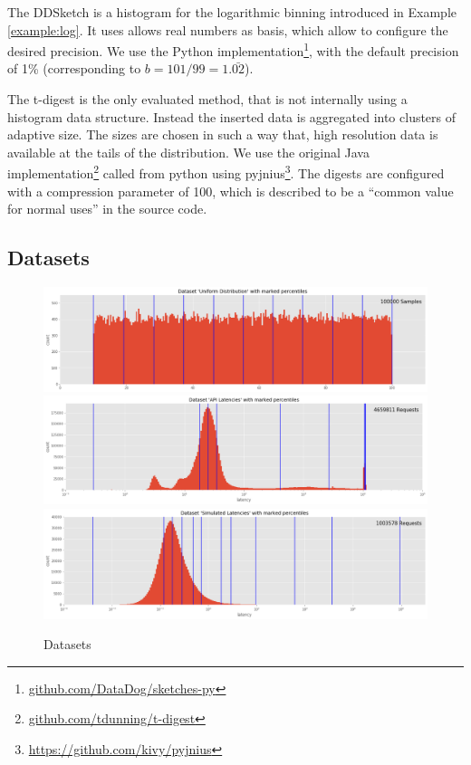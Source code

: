 \documentclass{article}
\theoremstyle{plain}
\theoremstyle{remark}
\begin{document}
The DDSketch is a histogram for the logarithmic binning introduced in Example \ref{example:log}.
It uses allows real numbers as basis, which allow to configure the desired precision.
We use the Python implementation\footnote{\url{github.com/DataDog/sketches-py}}, with the default
precision of 1\% (corresponding to $b=101/99=1.\bar{02}$).

The t-digest is the only evaluated method, that is not internally using a histogram data structure.
Instead the inserted data is aggregated into clusters of adaptive size.  The sizes are chosen in
such a way that, high resolution data is available at the tails of the distribution.  We use the
original Java implementation\footnote{\url{github.com/tdunning/t-digest}} called from python
using pyjnius\footnote{\url{https://github.com/kivy/pyjnius}}. The digests are configured with a
compression parameter of 100, which is described to be a ``common value for normal uses'' in
the source code.


\subsection{Datasets}

\begin{figure}
   \includegraphics[width=\textwidth]{evaluation/images/Uniform_Distribution_distribution_percentiles.png}
   \includegraphics[width=\textwidth]{evaluation/images/API_Latencies_distribution_percentiles.png}
   \includegraphics[width=\textwidth]{evaluation/images/Simulated_Latencies_distribution_percentiles.png}
   \caption{Datasets}
   \label{fig:ds}
\end{figure}
\end{document}
